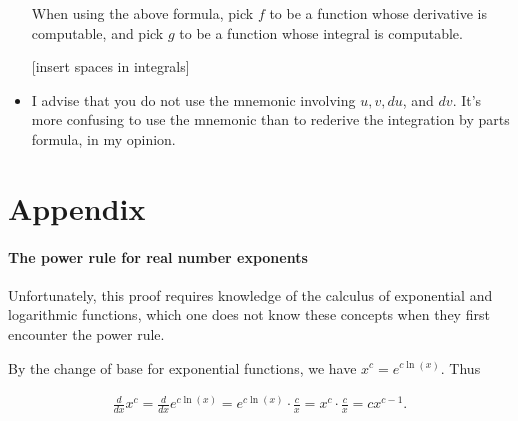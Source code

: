 \documentclass{article}
\begin{document}
\begin{itemize}
    When using the above formula, pick $f$ to be a function whose derivative is computable, and pick $g$ to be a function whose integral is computable.
    
    [insert spaces in integrals]
    
    
    \item I advise that you do not use the mnemonic involving $u, v, du$, and $dv$. It's more confusing to use the mnemonic than to rederive the integration by parts formula, in my opinion. 
\end{itemize}

\newpage

\part*{Appendix}

\subsection*{The power rule for real number exponents}

Unfortunately, this proof requires knowledge of the calculus of exponential and logarithmic functions, which one does not know these concepts when they first encounter the power rule.

By the change of base for exponential functions, we have $x^c = e^{c\ln(x)}$. Thus

\begin{align*}
    \frac{d}{dx} x^c = \frac{d}{dx} e^{c\ln(x)} = e^{c\ln(x)} \cdot \frac{c}{x} = x^c \cdot \frac{c}{x} = cx^{c - 1}.
\end{align*}




\end{document}

